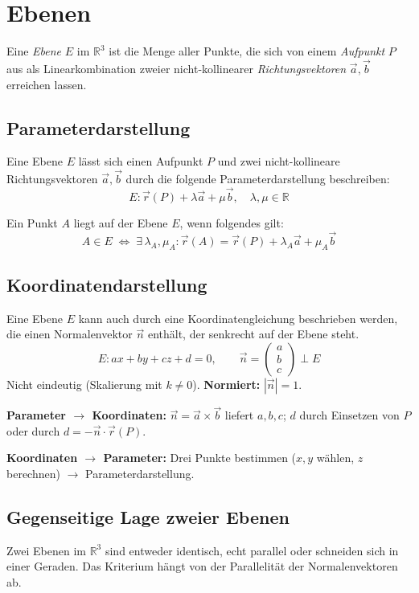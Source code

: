 \section{Ebenen}

Eine \emph{Ebene} $E$ im $\mathbb{R}^3$ ist die Menge aller Punkte, die sich von einem \emph{Aufpunkt} $P$ aus als Linearkombination zweier nicht-kollinearer \emph{Richtungsvektoren} $\vec{a}, \vec{b}$ erreichen lassen.

\subsection{Parameterdarstellung}
Eine Ebene $E$ lässt sich einen Aufpunkt $P$ und zwei nicht-kollineare Richtungsvektoren $\vec{a}, \vec{b}$ durch die folgende Parameterdarstellung beschreiben:
\[
     E\colon \vec{r}(P) + \lambda\vec{a} + \mu\vec{b}, \quad \lambda, \mu \in \mathbb{R}
\]

Ein Punkt $A$ liegt auf der Ebene $E$, wenn folgendes gilt:
\[
     A \in E \;\Leftrightarrow\; \exists\,\lambda_A, \mu_A\colon \vec{r}(A) = \vec{r}(P) + \lambda_A\vec{a} + \mu_A\vec{b}
\]

\subsection{Koordinatendarstellung}
Eine Ebene $E$ kann auch durch eine Koordinatengleichung beschrieben werden, die einen Normalenvektor $\vec{n}$ enthält, der senkrecht auf der Ebene steht.
\[
     E\colon ax + by + cz + d = 0, \qquad \vec{n} = \begin{pmatrix} a \\ b \\ c \end{pmatrix} \perp E
\]
Nicht eindeutig (Skalierung mit $k \neq 0$). \textbf{Normiert:} $|\vec{n}| = 1$.

\textbf{Parameter $\to$ Koordinaten:} $\vec{n} = \vec{a} \times \vec{b}$ liefert $a,b,c$; \; $d$ durch Einsetzen von $P$ oder durch $d = -\vec{n} \cdot \vec{r}(P)$.

\textbf{Koordinaten $\to$ Parameter:} Drei Punkte bestimmen ($x,y$ wählen, $z$ berechnen) $\to$ Parameterdarstellung.

\subsection{Gegenseitige Lage zweier Ebenen}

Zwei Ebenen im $\mathbb{R}^3$ sind entweder identisch, echt parallel oder schneiden sich in einer Geraden. Das Kriterium hängt von der Parallelität der Normalenvektoren ab.

